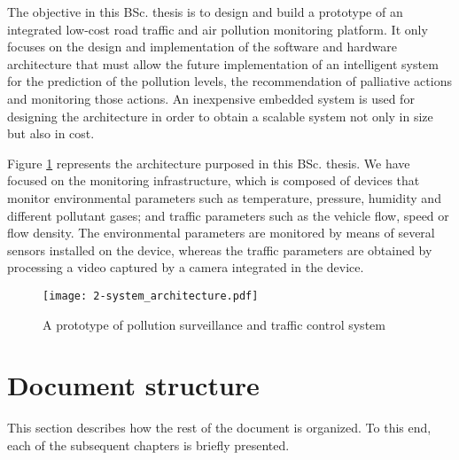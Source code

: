 The objective in this \ac{BSc.} thesis is to design and build a prototype of an integrated low-cost road traffic and air pollution monitoring platform. It only focuses on the design and implementation of the software and hardware architecture that must allow the future implementation of an intelligent system for the prediction of the pollution levels, the recommendation of palliative actions and monitoring those actions. An inexpensive embedded system is used for designing the architecture in order to obtain a scalable system not only in size but also in cost.

Figure \ref{fig:2-system_architecture} represents the architecture purposed in this \ac{BSc.} thesis. We have focused on the monitoring infrastructure, which is composed of devices that monitor environmental parameters such as temperature, pressure, humidity and different pollutant gases; and traffic parameters such as the vehicle flow, speed or flow density. The environmental parameters are monitored by means of several sensors installed on the device, whereas the traffic parameters are obtained by processing a video captured by a camera integrated in the device.


\begin{figure}[!h]
	\begin{center}
		\texttt{[image: 2-system\_architecture.pdf]}	
		\caption{A prototype of pollution surveillance and traffic control system}
		\label{fig:2-system_architecture}
	\end{center}
\end{figure}





\newpage
\section{Document structure}

This section describes how the rest of the document is organized. To this end, each of the subsequent chapters is briefly presented.

